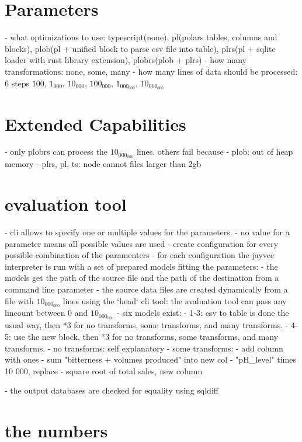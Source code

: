 \section{Parameters}
\label{section:parameters}
- what optimizations to use: typescript(none), pl(polars tables, columns and blocks), plob(pl + unified block to parse csv file into table), plrs(pl + sqlite loader with rust library extension), plobrs(plob + plrs)
- how many transformations: none, some, many
- how many lines of data should be processed: $6$ steps $100$, $1_000$, $10_000$, $100_000$, $1_000_000$, $10_000_000$

\section{Extended Capabilities}
- only plobrs can process the $10_000_000$ lines. others fail because
- plob: out of heap memory
- plrs, pl, ts: node cannot files larger than 2gb

\section{evaluation tool}
- cli allows to specify one or multiple values for the parameters.
- no value for a parameter means all possible values are used
- create configuration for every possible combination of the paramenters
- for each configuration  the jayvee interpreter is run with a set of prepared models fitting the parameters:
- the models get the path of the source file and the path of the destination from a command line parameter
- the source data files are created dynamically from a file with $10_000_000$ lines using the `head` cli tool: the avaluation tool can pass any lincount between 0 and $10_000_000$
- six models exist:
- 1-3: csv to table is done the usual way, then  *3 for no transforms, some transforms, and many transforms.
- 4-5: use the new block, then  *3 for no transforms, some transforms, and many transforms.
- no transforms: self explanatory
- some transforms:
- add column with ones
- sum "bitterness + volumes produced" into new col
-  "pH\_level" times 10 000, replace
- square root of total sales, new column

- the output databases are checked for equality using sqldiff



\section{the numbers}
